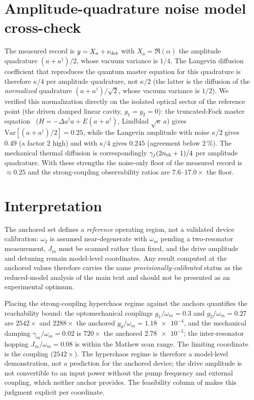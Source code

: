 \documentclass[Phys]{SciPost}
\begin{document}
\section{Amplitude-quadrature noise model cross-check}
\label{SI-sec:noise-model-crosscheck}
\label{SI-sec:noise-model-crosscheck}

The measured record is $y=X_a+\nu_{\rm det}$ with $X_a=\Re(\alpha)$ the
amplitude quadrature $(a+a^\dagger)/2$, whose vacuum variance is $1/4$. The
Langevin diffusion coefficient that reproduces the quantum master equation for
this quadrature is therefore $\kappa/4$ per amplitude quadrature, not
$\kappa/2$ (the latter is the diffusion of the \emph{normalized} quadrature
$(a+a^\dagger)/\sqrt2$, whose vacuum variance is $1/2$). We verified this
normalization directly on the isolated optical sector of the reference point
(the driven damped linear cavity, $g_1=g_2=0$): the truncated-Fock master
equation~\cite{walls2008,gardiner1985} ($H=-\Delta a^\dagger a+E(a+a^\dagger)$, Lindblad $\sqrt{\kappa}\,a$)
gives $\mathrm{Var}[(a+a^\dagger)/2]=\num{0.25}$, while the Langevin amplitude
with noise $\kappa/2$ gives $\num{0.49}$ (a factor $2$ high) and with
$\kappa/4$ gives $\num{0.245}$ (agreement below $\qty{2}{\percent}$). The mechanical thermal
diffusion is correspondingly $\gamma_j(2n_{\rm th}+1)/4$ per amplitude
quadrature. With these strengths the noise-only floor of the measured record
is $\approx\num{0.25}$ and the strong-coupling observability ratios are
$\num{7.6}$--$\num{17.0}\times$ the floor.

\section{Interpretation}
\label{SI-sec:interpretation}

The anchored set defines a \emph{reference} operating region, not a validated
device calibration: $\omega_2$ is assumed near-degenerate with $\omega_m$ pending a
two-resonator measurement, $J_m$ must be scanned rather than fixed, and the drive
amplitude and detuning remain model-level coordinates. Any result computed at the
anchored values therefore carries the same
\emph{provisionally-calibrated} status as the reduced-model analysis of the main text
and should not be presented as an experimental optimum.

Placing the strong-coupling hyperchaos regime against the anchors quantifies
the reachability bound: the optomechanical couplings
$g_1/\omega_m=\num{0.3}$ and $g_2/\omega_m=\num{0.27}$ are $\num{2542}\times$ and
$\num{2288}\times$ the anchored $g_0/\omega_m=\num{1.18e-4}$, and the mechanical
damping $\gamma_m/\omega_m=\num{0.02}$ is $\num{720}\times$ the anchored
$\num{2.78e-5}$; the inter-resonator hopping $J_m/\omega_m=\num{0.08}$ is within
the Mathew scan range. The limiting coordinate is the coupling
($\num{2542}\times$). The hyperchaos regime is therefore a model-level
demonstration, not a prediction for the anchored device; the drive amplitude is
not convertible to an input power without the pump frequency and external
coupling, which neither anchor provides. The feasibility column of
 makes this judgment explicit per coordinate.
\end{document}
